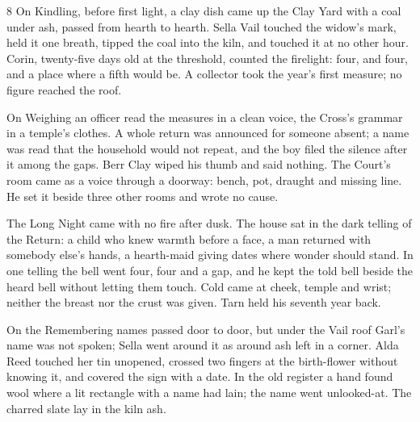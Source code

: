 





\CRtailpiece
\begin{CRchronicle}{8}
On Kindling, before first light, a clay dish came up the Clay Yard with a coal under ash, passed from hearth to hearth. Sella Vail touched the widow’s mark, held it one breath, tipped the coal into the kiln, and touched it at no other hour. Corin, twenty-five days old at the threshold, counted the firelight: four, and four, and a place where a fifth would be. A collector took the year’s first measure; no figure reached the roof.

On Weighing an officer read the measures in a clean voice, the Cross’s grammar in a temple’s clothes. A whole return was announced for someone absent; a name was read that the household would not repeat, and the boy filed the silence after it among the gaps. Berr Clay wiped his thumb and said nothing. The Court’s room came as a voice through a doorway: bench, pot, draught and missing line. He set it beside three other rooms and wrote no cause.

The Long Night came with no fire after dusk. The house sat in the dark telling of the Return: a child who knew warmth before a face, a man returned with somebody else’s hands, a hearth-maid giving dates where wonder should stand. In one telling the bell went four, four and a gap, and he kept the told bell beside the heard bell without letting them touch. Cold came at cheek, temple and wrist; neither the breast nor the crust was given. Tarn held his seventh year back.

On the Remembering names passed door to door, but under the Vail roof Garl’s name was not spoken; Sella went around it as around ash left in a corner. Alda Reed touched her tin unopened, crossed two fingers at the birth-flower without knowing it, and covered the sign with a date. In the old register a hand found wool where a lit rectangle with a name had lain; the name went unlooked-at. The charred slate lay in the kiln ash.


\end{CRchronicle}

